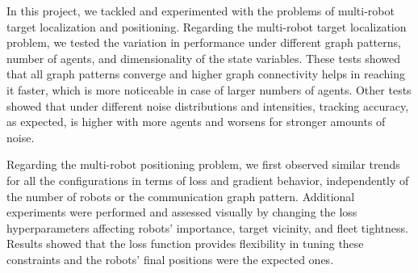 \documentclass[a4paper,11pt,oneside]{book}
\begin{document}
In this project, we tackled and experimented with the problems of multi-robot target localization and positioning. Regarding the multi-robot target localization problem, we tested the variation in performance under different graph patterns, number of agents, and dimensionality of the state variables. These tests showed that all graph patterns converge and higher graph connectivity helps in reaching it faster, which is more noticeable in case of larger numbers of agents. Other tests showed that under different noise distributions and intensities, tracking accuracy, as expected, is higher with more agents and worsens for stronger amounts of noise.

Regarding the multi-robot positioning problem, we first observed similar trends for all the configurations in terms of loss and gradient behavior, independently of the number of robots or the communication graph pattern. Additional experiments were performed and assessed visually by changing the loss hyperparameters affecting robots' importance, target vicinity, and fleet tightness. Results showed that the loss function provides flexibility in tuning these constraints and the robots' final positions were the expected ones.



\end{document}
